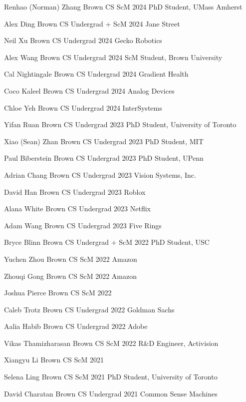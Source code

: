 \documentclass[line,margin]{res}
\begin{document}
\begin{resume}
\alumni
{Renhao (Norman) Zhang}
{Brown CS ScM}
{2024}
{PhD Student, UMass Amherst}


\alumni
{Alex Ding}
{Brown CS Undergrad + ScM}
{2024}
{Jane Street}

\alumni
{Neil Xu}
{Brown CS Undergrad}
{2024}
{Gecko Robotics}

\alumni
{Alex Wang}
{Brown CS Undergrad}
{2024}
{ScM Student, Brown University}

\alumni
{Cal Nightingale}
{Brown CS Undergrad}
{2024}
{Gradient Health}

\alumni
{Coco Kaleel}
{Brown CS Undergrad}
{2024}
{Analog Devices}

\alumni
{Chloe Yeh}
{Brown CS Undergrad}
{2024}
{InterSystems}

\alumni
{Yifan Ruan}
{Brown CS Undergrad}
{2023}
{PhD Student, University of Toronto}

\alumni
{Xiao (Sean) Zhan}
{Brown CS Undergrad}
{2023}
{PhD Student, MIT}

\alumni
{Paul Biberstein}
{Brown CS Undergrad}
{2023}
{PhD Student, UPenn}

\alumni
{Adrian Chang}
{Brown CS Undergrad}
{2023}
{Vision Systems, Inc.}

\alumni
{David Han}
{Brown CS Undergrad}
{2023}
{Roblox}

\alumni
{Alana White}
{Brown CS Undergrad}
{2023}
{Netflix}

\alumni
{Adam Wang}
{Brown CS Undergrad}
{2023}
{Five Rings}

\alumni
{Bryce Blinn}
{Brown CS Undergrad + ScM}
{2022}	
{PhD Student, USC}

\alumni
{Yuchen Zhou}
{Brown CS ScM}
{2022}
{Amazon}

\alumni
{Zhouqi Gong}
{Brown CS ScM}
{2022}
{Amazon}

\alumni
{Joshua Pierce}
{Brown CS ScM}
{2022}
{}

\alumni
{Caleb Trotz}
{Brown CS Undergrad}
{2022}
{Goldman Sachs}

\alumni
{Aalia Habib}
{Brown CS Undergrad}
{2022}
{Adobe}

\alumni
{Vikas Thamizharasan}
{Brown CS ScM}
{2022}
{R\&D Engineer, Activision}

\alumni
{Xiangyu Li}
{Brown CS ScM}
{2021}
{}

\alumni
{Selena Ling}
{Brown CS ScM}
{2021}
{PhD Student, University of Toronto}

\alumni
{David Charatan}
{Brown CS Undergrad}
{2021}
{Common Sense Machines}


\end{resume}
\end{document}
